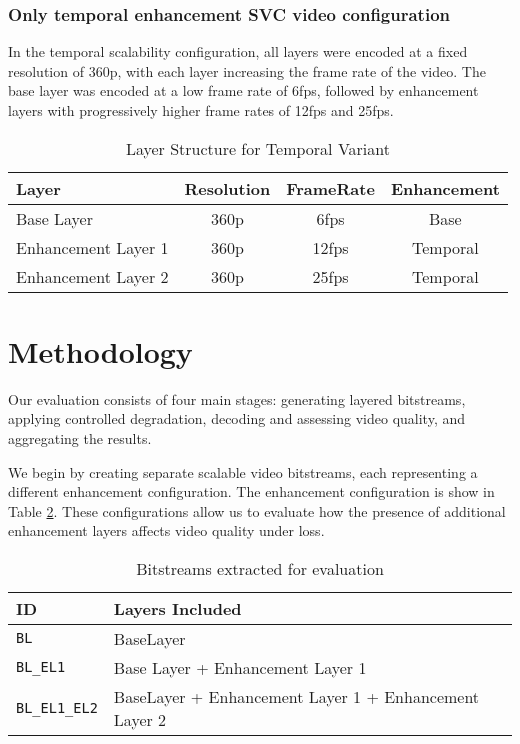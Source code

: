 \subsubsection{Only temporal enhancement SVC video configuration}

In the temporal scalability configuration, all layers were encoded at a fixed
resolution of 360p, with each layer increasing the frame rate of the video. The
base layer was encoded at a low frame rate of 6fps, followed by enhancement layers with
progressively higher frame rates of 12fps and 25fps.

\begin{table}[H]
    \centering
    \begin{tabular}{l|c|c|c}
        \toprule
        Layer               & Resolution    & FrameRate & Enhancement   \\
        \midrule
        Base Layer          & 360p          & 6fps      & Base          \\
        Enhancement Layer 1 & 360p          & 12fps     & Temporal      \\
        Enhancement Layer 2 & 360p          & 25fps     & Temporal      \\
        \bottomrule
    \end{tabular}
    \caption{Layer Structure for Temporal Variant}
    \label{tab:layer_structure_temporal}
\end{table}

\section{Methodology}

Our evaluation consists of four main stages: generating layered bitstreams,
applying controlled degradation, decoding and assessing video quality, and
aggregating the results.


We begin by creating separate scalable video bitstreams, each representing a
different enhancement configuration. The enhancement configuration is show in Table \ref{tab:bitstreams}. 
These configurations allow us to evaluate how the presence of additional
enhancement layers affects video quality under loss.

\begin{table}[H]
    \centering
    \begin{tabular}{l|l}
        \toprule
        ID                      & Layers Included                                        \\
        \midrule
        \texttt{BL}             & BaseLayer                                              \\
        \texttt{BL\_EL1}        & Base Layer + Enhancement Layer 1                       \\
        \texttt{BL\_EL1\_EL2}   & BaseLayer + Enhancement Layer 1 + Enhancement Layer 2  \\
        \bottomrule
    \end{tabular}
    \caption{Bitstreams extracted for evaluation}
    \label{tab:bitstreams}
\end{table}


